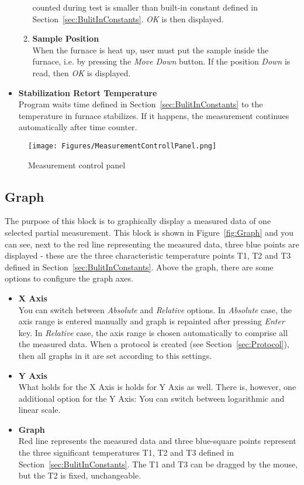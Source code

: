 \documentclass[a4paper,11pt,twoside]{book}
\theoremstyle{named}
\begin{document}
\begin{itemize}
\begin{enumerate}
        counted during test is smaller than built-in constant defined in
        Section~\ref{sec:BulitInConstants}. \textit{OK} is then displayed.
      \item \textbf{Sample Position} \\
        When the furnace is heat up, user must put the sample inside the
        furnace, i.e. by pressing the \textit{Move Down} button. If the position
        \textit{Down} is read, then \textit{OK} is displayed.
    \end{enumerate}
  \item \textbf{Stabilization Retort Temperature} \\
    Program waits time defined in Section~\ref{sec:BulitInConstants} to the
    temperature in furnace stabilizes. If it happens, the measurement continues
    automatically after time counter. 
\end{itemize}

\begin{figure}[t]
  \centering
  \texttt{[image: Figures/MeasurementControllPanel.png]}
  \caption{Measurement control panel}
  \label{fig:MeasurementControlPanel}
\end{figure}

\subsection{Graph}
\label{sec:Graph}

The purpose of this block is to graphically display a measured data of one
selected partial measurement. This block is shown in Figure~\ref{fig:Graph} and
you can see, next to the red line representing the measured data, three blue
points are displayed - these are the three characteristic temperature points T1,
T2 and T3 defined in Section~\ref{sec:BulitInConstants}. Above the graph, there
are some options to configure the graph axes. 

\begin{itemize}
  \item \textbf{X Axis} \\
    You can switch between \textit{Absolute} and \textit{Relative} options. In
    \textit{Absolute} case, the axis range is entered manually and graph is
    repainted after pressing \textit{Enter} key. In \textit{Relative} case, the
    axis range is chosen automatically to comprise all the measured data. When
    a protocol is created (see Section~\ref{sec:Protocol}), then all graphs
    in it are set according to this settings.
  \item \textbf{Y Axis} \\
    What holds for the X Axis is holds for Y Axis as well. There is, however,
    one additional option for the Y Axis: You can switch between logarithmic and
    linear scale.
  \item \textbf{Graph} \\
    Red line represents the measured data and three blue-square points represent
    the three significant temperatures T1, T2 and T3 defined in
    Section~\ref{sec:BulitInConstants}. The T1 and T3 can be dragged by the
    mouse, but the T2 is fixed, unchangeable.
\end{itemize}
\end{document}
